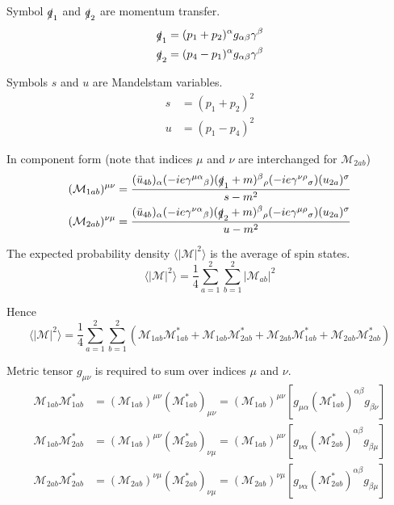 Symbol $\slashed q_1$ and $\slashed q_2$ are momentum transfer.
\begin{align*}
\slashed q_1&=(p_1+p_2)^\alpha g_{\alpha\beta}\gamma^\beta
\\
\slashed q_2&=(p_4-p_1)^\alpha g_{\alpha\beta}\gamma^\beta
\end{align*}

Symbols $s$ and $u$ are Mandelstam variables.
\begin{align*}
s&=(p_1+p_2)^2
\\
u&=(p_1-p_4)^2
\end{align*}

In component form (note that indices $\mu$ and $\nu$ are interchanged for $\mathcal M_{2ab}$)
\begin{align*}
(\mathcal M_{1ab})^{\mu\nu}=\frac{
(\bar{u}_{4b})_\alpha
(-ie\gamma^{\mu\alpha}{}_\beta)
(\slashed{q}_1+m)^\beta{}_\rho
(-ie\gamma^{\nu\rho}{}_\sigma)
(u_{2a})^\sigma}{s-m^2}
\\
(\mathcal M_{2ab})^{\nu\mu}=\frac{
(\bar{u}_{4b})_\alpha
(-ie\gamma^{\nu\alpha}{}_\beta)
(\slashed{q}_2+m)^\beta{}_\rho
(-ie\gamma^{\mu\rho}{}_\sigma)
(u_{2a})^\sigma}{u-m^2}
\end{align*}

The expected probability density $\langle|\mathcal M|^2\rangle$
is the average of spin states.
\begin{equation*}
\langle|\mathcal M|^2\rangle=\frac{1}{4}\sum_{a=1}^2\sum_{b=1}^2|\mathcal M_{ab}|^2
\end{equation*}

Hence
\begin{equation*}
\langle|\mathcal{M}|^2\rangle
=\frac{1}{4}\sum_{a=1}^2\sum_{b=1}^2
\left(
\mathcal M_{1ab}\mathcal M_{1ab}^*
+\mathcal M_{1ab}\mathcal M_{2ab}^*+\mathcal M_{2ab}\mathcal M_{1ab}^*
+\mathcal M_{2ab}\mathcal M_{2ab}^*
\right)
\end{equation*}

Metric tensor $g_{\mu\nu}$ is required to sum over indices $\mu$ and $\nu$.
\begin{align*}
\mathcal M_{1ab}\mathcal M_{1ab}^*&=(\mathcal M_{1ab})^{\mu\nu}(\mathcal M_{1ab}^*)_{\mu\nu}
=(\mathcal M_{1ab})^{\mu\nu}\left[g_{\mu\alpha}(\mathcal M_{1ab}^*)^{\alpha\beta}g_{\beta\nu}\right]
\\
\mathcal M_{1ab}\mathcal M_{2ab}^*&=(\mathcal M_{1ab})^{\mu\nu}(\mathcal M_{2ab}^*)_{\nu\mu}
=(\mathcal M_{1ab})^{\mu\nu}\left[g_{\nu\alpha}(\mathcal M_{2ab}^*)^{\alpha\beta}g_{\beta\mu}\right]
\\
\mathcal M_{2ab}\mathcal M_{2ab}^*&=(\mathcal M_{2ab})^{\nu\mu}(\mathcal M_{2ab}^*)_{\nu\mu}
=(\mathcal M_{2ab})^{\nu\mu}\left[g_{\nu\alpha}(\mathcal M_{2ab}^*)^{\alpha\beta}g_{\beta\mu}\right]
\end{align*}

